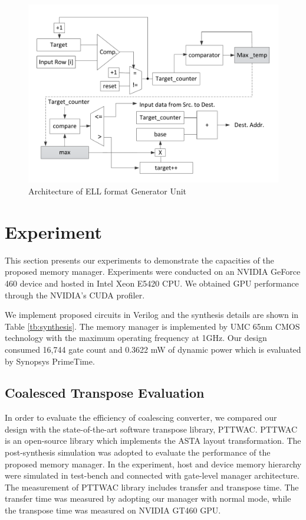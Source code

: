 \documentclass[10pt,journal,compsoc]{IEEEtran}
\begin{document}
\begin{figure}[t]
\begin{center}
\graphicspath{{picture/}}
\includegraphics[scale=0.4]{ELL_generator}
\caption{Architecture of ELL format Generator Unit}
\label{fig:ELL}
\end{center}
\end{figure}




\section{Experiment}
\label{cha:experiment}
This section presents our experiments to demonstrate the capacities of the proposed memory manager.
Experiments were conducted on an NVIDIA GeForce 460 device and hosted in Intel Xeon E5420 CPU. We obtained GPU performance through the NVIDIA's CUDA profiler.

We implement proposed circuits in Verilog and the synthesis details are shown in Table \ref{tb:synthesis}.
The memory manager is implemented by UMC 65nm CMOS technology with the maximum operating frequency at 1GHz.
Our design consumed 16,744 gate count and 0.3622 mW of dynamic power which is evaluated by Synopsys PrimeTime.

\subsection{Coalesced Transpose Evaluation}
In order to evaluate the efficiency of coalescing converter, we compared our design with the state-of-the-art software transpose library, PTTWAC\cite{ASTA}.
PTTWAC is an open-source library which implements the ASTA layout transformation. The post-synthesis simulation was adopted to
evaluate the performance of the proposed memory manager. In the experiment, host
and device memory hierarchy were simulated in test-bench and connected with gate-level manager architecture. The measurement of PTTWAC
library includes transfer and transpose time. The transfer time was measured by adopting our manager with normal mode, while
the transpose time was measured on NVIDIA GT460 GPU.
\end{document}
